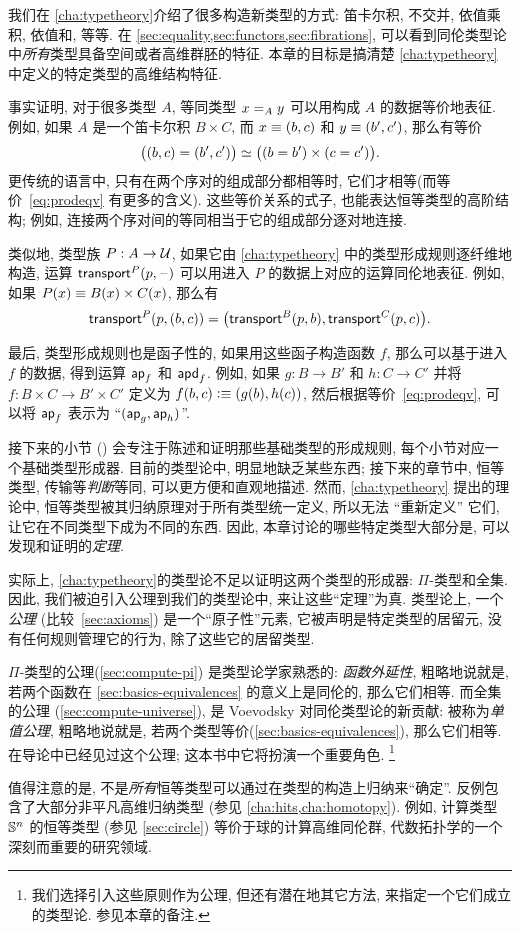 我们在 \cref{cha:typetheory}介绍了很多构造新类型的方式: 笛卡尔积, 不交并, 依值乘积, 依值和, 等等.
在 \cref{sec:equality,sec:functors,sec:fibrations}, 可以看到同伦类型论中\emph{所有}类型具备空间或者高维群胚的特征.
本章的目标是搞清楚 \cref{cha:typetheory} 中定义的特定类型的高维结构特征.

事实证明, 对于很多类型 $A$, 等同类型 $\id[A]xy$ 可以用构成 $A$ 的数据等价地表征.
例如, 如果 $A$ 是一个笛卡尔积 $B\times C$, 而 $x\jdeq (b,c)$ 和 $y\jdeq(b',c')$, 那么有等价
\begin{equation}\label{eq:prodeqv}
  \eqv{\big((b,c)=(b',c')\big)}{\big((b=b')\times (c=c')\big)}.
\end{equation}
更传统的语言中, 只有在两个序对的组成部分都相等时, 它们才相等(而等价~\eqref{eq:prodeqv} 有更多的含义).
这些等价关系的式子, 也能表达恒等类型的高阶结构;
例如, 连接两个序对间的等同相当于它的组成部分逐对地连接.

类似地, 类型族 $P:A\to\type$, 如果它由 \cref{cha:typetheory} 中的类型形成规则逐纤维地构造, 运算 $\transfib{P}{p}{\blank}$ 可以用进入 $P$ 的数据上对应的运算同伦地表征.
例如, 如果 $P(x) \jdeq B(x)\times C(x)$, 那么有
\[\transfib{P}{p}{(b,c)} = \big(\transfib{B}{p}{b},\transfib{C}{p}{c}\big).\]

最后, 类型形成规则也是函子性的, 如果用这些函子构造函数 $f$, 那么可以基于进入 $f$ 的数据, 得到运算 $\apfunc f$ 和 $\apdfunc f$.
例如, 如果 $g:B\to B'$ 和 $h:C\to C'$ 并将 $f:B\times C \to B'\times C'$ 定义为 $f(b,c)\defeq (g(b),h(c))$, 然后根据等价~\eqref{eq:prodeqv}, 可以将 $\apfunc f$ 表示为 ``$(\apfunc g,\apfunc h)$''.

接下来的小节 () 会专注于陈述和证明那些基础类型的形成规则, 每个小节对应一个基础类型形成器.
目前的类型论中, 明显地缺乏某些东西;
接下来的章节中, 恒等类型, 传输等\emph{判断}等同, 可以更方便和直观地描述.
然而, \cref{cha:typetheory} 提出的理论中, 恒等类型被其归纳原理对于所有类型统一定义, 所以无法 ``重新定义'' 它们, 让它在不同类型下成为不同的东西.
因此, 本章讨论的哪些特定类型大部分是, 可以发现和证明的\emph{定理}.

实际上, \cref{cha:typetheory}的类型论不足以证明这两个类型的形成器: $\Pi$-类型和全集.
因此, 我们被迫引入公理到我们的类型论中, 来让这些``定理''为真.
类型论上, 一个\emph{公理} (比较~\cref{sec:axioms}) 是一个``原子性''元素, 它被声明是特定类型的居留元, 没有任何规则管理它的行为, 除了这些它的居留类型.
%

%
%
$\Pi$-类型的公理(\cref{sec:compute-pi}) 是类型论学家熟悉的: \emph{函数外延性}, 粗略地说就是, 若两个函数在 \cref{sec:basics-equivalences} 的意义上是同伦的, 那么它们相等.
而全集的公理 (\cref{sec:compute-universe}), 是 Voevodsky 对同伦类型论的新贡献: 被称为\emph{单值公理}, 粗略地说就是, 若两个类型等价(\cref{sec:basics-equivalences}), 那么它们相等.
在导论中已经见过这个公理; 这本书中它将扮演一个重要角色.%
\footnote{我们选择引入这些原则作为公理, 但还有潜在地其它方法, 来指定一个它们成立的类型论.
  参见本章的备注.}

值得注意的是, 不是\emph{所有}恒等类型可以通过在类型的构造上归纳来``确定''.
反例包含了大部分非平凡高维归纳类型 (参见 \cref{cha:hits,cha:homotopy}).
例如, 计算类型 $\Sn^n$ 的恒等类型 (参见 \cref{sec:circle}) 等价于球的计算高维同伦群, 代数拓扑学的一个深刻而重要的研究领域.